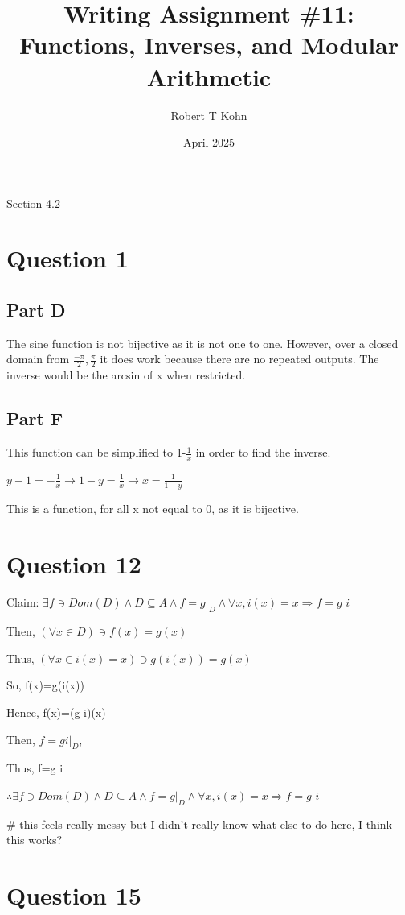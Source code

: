 \documentclass{article}
\title{Writing Assignment \#11: Functions, Inverses, and Modular Arithmetic}
\author{Robert T Kohn}
\date{April 2025}
\begin{document}
\maketitle
{\huge{Section 4.2}}
\section*{Question 1}
\subsection*{Part D}

The sine function is not bijective as it is not one to one. However, over a closed domain from $\frac{-\pi}{2},\frac{\pi}{2}$ it does work because there are no repeated outputs. The inverse would be the arcsin of x when restricted.

\subsection*{Part F}

This function can be simplified to 1-$\frac{1}{x}$ in order to find the inverse. 

$y-1=-\frac{1}{x} \rightarrow 1-y=\frac{1}{x} \rightarrow x=\frac{1}{1-y}$

This is a function, for all x not equal to 0, as it is bijective. 

\section*{Question 12}

Claim: $\exists f \ni Dom(D) \wedge D \subseteq A \wedge f=g|_D \wedge \forall x, i(x)=x \Rightarrow f= g$ \textopenbullet  $i$

Then, $(\forall x \in D) \ni f(x)=g(x)$

Thus, $(\forall x \in i(x)=x) \ni g(i(x))=g(x)$

So, f(x)=g(i(x))

Hence, f(x)=(g \textopenbullet  i)(x)

Then, $f=g$\textopenbullet$i|_D$,

Thus, f=g \textopenbullet i

$\therefore \exists f \ni Dom(D) \wedge D \subseteq A \wedge f=g|_D \wedge \forall x, i(x)=x \Rightarrow f= g$ \textopenbullet  $i$\

\# this feels really messy but I didn't really know what else to do here, I think this works?

\section*{Question 15}
\end{document}
